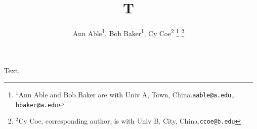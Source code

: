 \documentclass{article}
\begin{document}
\title{T}
\author{
 Ann Able\textsuperscript{\rm 1},
 Bob Baker\textsuperscript{\rm 1},
 Cy Coe\textsuperscript{\rm 2}
\thanks{$^{1}$Ann Able and Bob Baker are with Univ A, Town, China.{\tt\footnotesize aable@a.edu, bbaker@a.edu}}%
\thanks{$^{2}$Cy Coe, corresponding author, is with Univ B, City, China.{\tt\footnotesize ccoe@b.edu}}%
}
\maketitle
Text.
\end{document}
